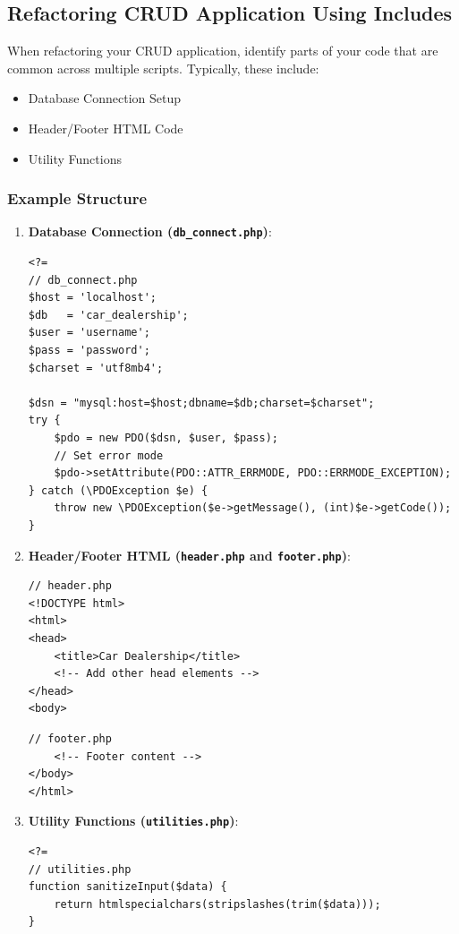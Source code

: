\documentclass[11pt]{article}
\begin{document}
\subsection{Refactoring CRUD Application Using Includes}
\label{sec:org87b53b6}
When refactoring your CRUD application, identify parts of your code that
are common across multiple scripts. Typically, these include:

\begin{itemize}
\item Database Connection Setup
\item Header/Footer HTML Code
\item Utility Functions
\end{itemize}

\subsubsection{Example Structure}
\label{sec:orgecb90aa}
\begin{enumerate}
\item \textbf{Database Connection (\texttt{db\_connect.php})}:

\begin{verbatim}
<?=
// db_connect.php
$host = 'localhost';
$db   = 'car_dealership';
$user = 'username';
$pass = 'password';
$charset = 'utf8mb4';

$dsn = "mysql:host=$host;dbname=$db;charset=$charset";
try {
    $pdo = new PDO($dsn, $user, $pass);
    // Set error mode
    $pdo->setAttribute(PDO::ATTR_ERRMODE, PDO::ERRMODE_EXCEPTION);
} catch (\PDOException $e) {
    throw new \PDOException($e->getMessage(), (int)$e->getCode());
}
\end{verbatim}

\item \textbf{Header/Footer HTML (\texttt{header.php} and \texttt{footer.php})}:

\begin{verbatim}
// header.php
<!DOCTYPE html>
<html>
<head>
    <title>Car Dealership</title>
    <!-- Add other head elements -->
</head>
<body>
\end{verbatim}

\begin{verbatim}
// footer.php
    <!-- Footer content -->
</body>
</html>
\end{verbatim}

\item \textbf{Utility Functions (\texttt{utilities.php})}:

\begin{verbatim}
<?=
// utilities.php
function sanitizeInput($data) {
    return htmlspecialchars(stripslashes(trim($data)));
}
\end{verbatim}
\end{enumerate}
\end{document}
